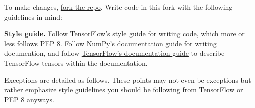 To make changes,
\href{https://help.github.com/articles/working-with-forks/}{fork the repo}.
Write code in this fork with the following guidelines in mind:

\textbf{Style guide.}
Follow
\href{https://www.tensorflow.org/versions/master/how_tos/style_guide.html}{TensorFlow's
style guide}
for writing code, which more or less follows PEP 8.
Follow
\href{https://github.com/numpy/numpy/blob/master/doc/HOWTO_DOCUMENT.rst.txt}
{NumPy's documentation guide}
for writing documention,
and follow
\href{https://www.tensorflow.org/versions/master/how_tos/documentation/index.html}{TensorFlow's documentation guide}
to describe TensorFlow tensors within the documentation.

Exceptions are detailed as follows. These points may not
even be exceptions but rather emphasize style guidelines you
should be following from TensorFlow or PEP 8 anyways.

